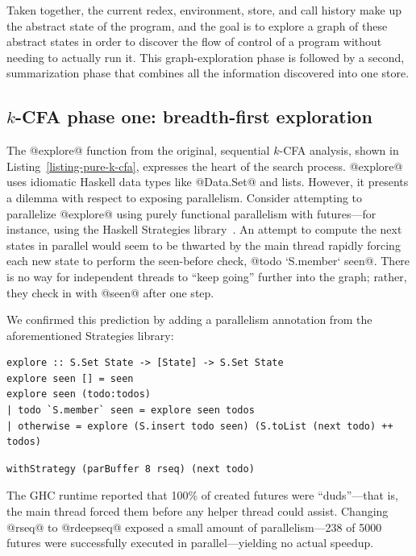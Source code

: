 Taken together, the current redex, environment, store, and call
history make up the abstract state of the program, and the goal is to
explore a graph of these abstract states in order to discover the flow
of control of a program without needing to actually run it.  This
graph-exploration phase is followed by a second, summarization phase
that combines all the information discovered into one store.

\subsection{$k$-CFA phase one: breadth-first exploration}

The @explore@ function from the original, sequential $k$-CFA
analysis, shown in Listing~\ref{listing-pure-k-cfa}, expresses
the heart of the search process.  @explore@ uses idiomatic Haskell
data types like @Data.Set@ and lists.  However, it presents a dilemma
with respect to exposing parallelism.  Consider attempting to
parallelize @explore@ using purely functional parallelism with
futures---for instance, using the Haskell Strategies
library~\cite{marlow-par}.  An attempt to compute the next states in
parallel would seem to be thwarted by the main thread rapidly forcing
each new state to perform the seen-before check, @todo `S.member` seen@.
There is no way for independent threads to ``keep going'' further into
the graph; rather, they check in with @seen@ after one step.

We confirmed this prediction by adding a parallelism annotation from
the aforementioned Strategies library:

\singlespacing
\begin{lstlisting}[float, caption={The \il{explore} function from a purely functional $k$-CFA implementation.}, label=listing-pure-k-cfa]
explore :: S.Set State -> [State] -> S.Set State
explore seen [] = seen
explore seen (todo:todos)
| todo `S.member` seen = explore seen todos
| otherwise = explore (S.insert todo seen) (S.toList (next todo) ++ todos)
\end{lstlisting}
\doublespacing

\singlespacing
\begin{lstlisting}
withStrategy (parBuffer 8 rseq) (next todo)
\end{lstlisting}
\doublespacing

\noindent The GHC runtime reported that 100\% of created futures were
``duds''---that is, the main thread forced them before any helper
thread could assist.  Changing @rseq@ to @rdeepseq@ exposed a small
amount of parallelism---238 of 5000 futures were successfully executed in
parallel---yielding no actual speedup.

